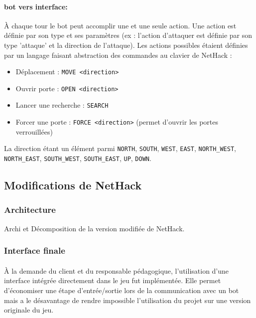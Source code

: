 \documentclass[a4paper,11pt]{article}
\begin{document}
\paragraph{bot vers interface:} À chaque tour le bot peut accomplir une et une seule action. Une action est définie par son type et ses paramètres (ex : l'action d'attaquer est définie par son type 'attaque' et la direction de l'attaque). Les actions possibles étaient définies par un langage faisant abstraction des commandes au clavier de NetHack :
\begin{itemize}
	\item Déplacement : \verb!MOVE <direction>!
	\item Ouvrir porte : \verb!OPEN <direction>!
	\item Lancer une recherche : \verb!SEARCH!
	\item Forcer une porte : \verb!FORCE <direction>! (permet d'ouvrir les portes verrouillées)
\end{itemize}
\noindent La direction étant un élément parmi \verb!NORTH!, \verb!SOUTH!, \verb!WEST!, \verb!EAST!, \verb!NORTH_WEST!, \verb!NORTH_EAST!, \verb!SOUTH_WEST!, \verb!SOUTH_EAST!, \verb!UP!, \verb!DOWN!.


\subsection{Modifications de NetHack}

\subsubsection{Architecture}

Archi et Décomposition de la version modifiée de NetHack.

\subsubsection{Interface finale}

\paragraph{}À la demande du client et du responsable pédagogique, l'utilisation d'une interface intégrée directement dans le jeu fut implémentée. Elle permet d'économiser une étape d'entrée/sortie lors de la communication avec un bot mais a le désavantage de rendre impossible l'utilisation du projet sur une version originale du jeu.
\end{document}
